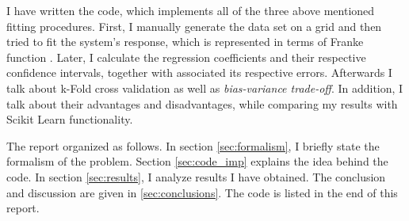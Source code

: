 I have written the code, which implements all of the three above mentioned fitting procedures. First, I manually generate the data set on a grid and then tried to fit the system's response, which is represented in terms of Franke function \cite{Morten}. Later, I calculate the regression coefficients and their respective confidence intervals, together with associated its respective errors. Afterwards I talk about k-Fold cross validation as well as \textit{bias-variance trade-off}. In addition, I talk about their advantages and disadvantages, while comparing my results with Scikit Learn functionality.

The report organized as follows. In section \ref{sec:formalism}, I briefly state the formalism of the problem. Section \ref{sec:code_imp} explains the idea behind the code. In section \ref{sec:results}, I analyze results I have obtained. The conclusion and discussion are given in \ref{sec:conclusions}. The code is listed in the end of this report.